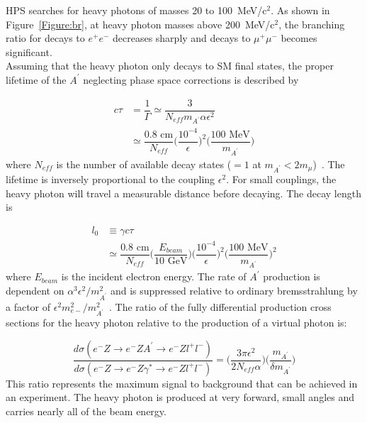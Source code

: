 HPS searches for heavy photons of masses 20 to 100~MeV/c$^2$. As shown in Figure~\ref{Figure:br}, at heavy photon masses above 200~MeV/c$^2$, the branching ratio for decays to $e^+e^-$ decreases sharply and decays to $\mu^+\mu^-$ becomes significant. \\
\indent Assuming that the heavy photon only decays to SM final states, the proper lifetime of the $A^{\prime}$ neglecting phase space corrections is described by   

\begin{equation}
	\label{eq:propLife}
	\begin{split}
	c\tau &= \dfrac{1}{\Gamma}\simeq \dfrac{3}{N_{eff}m_{A^{\prime}}\alpha\epsilon^2}\\
	&\simeq \dfrac{0.8\textrm{ cm}}{N_{eff}}\Big({\dfrac{10^{-4}}{\epsilon}}\Big)^2\Big(\dfrac{100\textrm{ MeV}}{m_{A^{\prime}}}\Big)
	\end{split}
\end{equation}
where $N_{eff}$ is the number of available decay states ($=1$ at $m_{A^{\prime}}<2m_{\mu}$)~\cite{bjorken_new_2009}. The lifetime is inversely proportional to the coupling $\epsilon^2$. For small couplings, the heavy photon will travel a measurable distance before decaying. The decay length is 

\begin{equation}
	\label{eq:decayL}
	\begin{split}
	l_0 &\equiv \gamma c \tau \\
	&\simeq \dfrac{0.8\textrm{ cm}}{N_{eff}}\Big(\dfrac{E_{beam}}{10\textrm{ GeV}}\Big)\Big({\dfrac{10^{-4}}{\epsilon}}\Big)^2\Big(\dfrac{100\textrm{ MeV}}{m_{A^{\prime}}}\Big)^2
	\end{split}
\end{equation}
where $E_{beam}$ is the incident electron energy. The rate of $A^{\prime}$ production is dependent on $\alpha^3\epsilon^2/m_{A^{\prime}}^2$ and is suppressed relative to ordinary bremsstrahlung by a factor of $\epsilon^2m_{e-}^2/m_{A^{\prime}}^2$~\cite{bjorken_new_2009}. The ratio of the fully differential production cross sections for the heavy photon relative to the production of a virtual photon is:

\begin{equation}
	\label{eq:production}
	\dfrac{d\sigma(e^-Z\rightarrow e^-ZA^{\prime}\rightarrow e^-Zl^+l^-)}{d\sigma(e^-Z\rightarrow e^-Z\gamma^{\ast}\rightarrow e^-Zl^+l^-)} = \Big(\dfrac{3\pi\epsilon^2}{2N_{eff}\alpha}\Big) \Big(\dfrac{m_{A^{\prime}}}{\delta m_{A^{\prime}}}\Big)
\end{equation}
This ratio represents the maximum signal to background that can be achieved in an experiment. The heavy photon is produced at very forward, small angles and carries nearly all of the beam energy. \\

